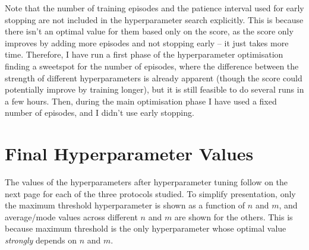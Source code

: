 Note that the number of training episodes and the patience interval used for early stopping are not included in the hyperparameter search explicitly. This is because there isn't an optimal value for them based only on the score, as the score only improves by adding more episodes and not stopping early -- it just takes more time. Therefore, I have run a first phase of the hyperparameter optimisation finding a sweetspot for the number of episodes, where the difference between the strength of different hyperparameters is already apparent (though the score could potentially improve by training longer), but it is still feasible to do several runs in a few hours. Then, during the main optimisation phase I have used a fixed number of episodes, and I didn't use early stopping.


\section*{Final Hyperparameter Values}

The values of the hyperparameters after hyperparameter tuning follow on the next page for each of the three protocols studied. To simplify presentation, only the maximum threshold hyperparameter is shown as a function of $n$ and $m$, and average/mode values across different $n$ and $m$ are shown for the others. This is because maximum threshold is the only hyperparameter whose optimal value \textit{strongly} depends on $n$ and $m$.

